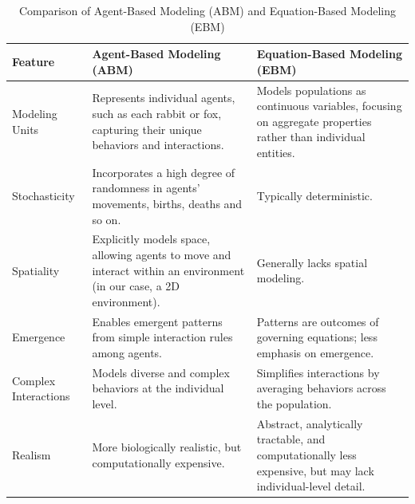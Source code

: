 \begin{table}[h!]
    \centering
    \begin{tabular}{|l|p{4.5cm}|p{4.5cm}|}
    \hline
    \textbf{Feature} & \textbf{Agent-Based Modeling (ABM)} & \textbf{Equation-Based Modeling (EBM)} \\
    \hline
    Modeling Units & Represents individual agents, such as each rabbit or fox, capturing their unique behaviors and interactions. & Models populations as continuous variables, focusing on aggregate properties rather than individual entities. \\
    \hline
    Stochasticity & Incorporates a high degree of randomness in agents' movements, births, deaths and so on. & Typically deterministic. \\
    \hline
    Spatiality & Explicitly models space, allowing agents to move and interact within an environment (in our case, a 2D environment). & Generally lacks spatial modeling. \\
    \hline
    Emergence & Enables emergent patterns from simple interaction rules among agents. & Patterns are outcomes of governing equations; less emphasis on emergence. \\
    \hline
    Complex Interactions & Models diverse and complex behaviors at the individual level. & Simplifies interactions by averaging behaviors across the population. \\
    \hline
    Realism & More biologically realistic, but computationally expensive. & Abstract, analytically tractable, and computationally less expensive, but may lack individual-level detail. \\
    \hline
    \end{tabular}
    \caption{Comparison of Agent-Based Modeling (ABM) and Equation-Based Modeling (EBM)}
    \label{tab:diff_two_models_predator_prey}
\end{table}

